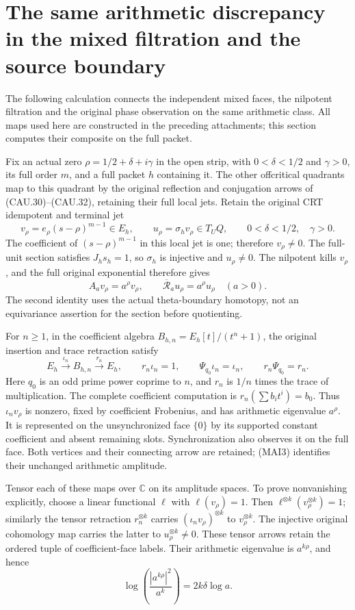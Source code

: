 \section{The same arithmetic discrepancy in the mixed filtration and the source boundary}
\label{CFStage:sec:mixed-amplification-identity}

The following calculation connects the independent mixed faces, the
nilpotent filtration and the original phase observation on the same
arithmetic class. All maps used here are constructed in the preceding
attachments; this section computes their composite on the full packet.

Fix an actual zero $\rho=1/2+\delta+i\gamma$ in the open strip,
with $0<\delta<1/2$ and $\gamma>0$, its full order $m$, and a
full packet $h$ containing it. The other offcritical quadrants
map to this quadrant by the original reflection and conjugation
arrows of (CAU.30)--(CAU.32), retaining their full local jets.
Retain
the original CRT idempotent and terminal jet
\[
 v_\rho=e_\rho(s-\rho)^{m-1}\in E_h,
 \qquad u_\rho=\sigma_hv_\rho\in T_UQ,
 \qquad 0<\delta<1/2,\quad\gamma>0.
 \tag{MAI1}
\]
The coefficient of $(s-\rho)^{m-1}$ in this local jet is one;
therefore $v_\rho\ne0$. The full-unit section satisfies
$J_hs_h=1$, so $\sigma_h$ is injective and $u_\rho\ne0$.
The nilpotent kills $v_\rho$, and the full original exponential
therefore gives
\[
 A_av_\rho=a^\rho v_\rho,
 \qquad \overline{\mathcal R}_a u_\rho=a^\rho u_\rho
 \quad(a>0).
 \tag{MAI2}
\]
The second identity uses the actual theta-boundary homotopy, not an
equivariance assertion for the section before quotienting.

For $n\geq1$, in the coefficient algebra $B_{h,n}=E_h[t]/(t^n+1)$, the original
insertion and trace retraction satisfy
\[
 E_h\xrightarrow{\iota_n}B_{h,n}\xrightarrow{r_n}E_h,
 \qquad r_n\iota_n=1,
 \qquad \Psi_{q_0}\iota_n=\iota_n,
 \qquad r_n\Psi_{q_0}=r_n.
 \tag{MAI3}
\]
Here $q_0$ is an odd prime power coprime to $n$, and $r_n$ is $1/n$ times
the trace of multiplication. The complete coefficient computation
is $r_n(\sum b_it^i)=b_0$. Thus $\iota_nv_\rho$ is nonzero,
fixed by coefficient Frobenius, and has arithmetic eigenvalue
$a^\rho$. It is represented on the unsynchronized face $\{0\}$
by its supported constant coefficient and absent remaining slots.
Synchronization also observes it on the full face. Both vertices
and their connecting arrow are retained; (MAI3) identifies their
unchanged arithmetic amplitude.

Tensor each of these maps over $\mathbb C$ on its amplitude
spaces. To prove nonvanishing explicitly, choose a linear
functional $\ell$ with $\ell(v_\rho)=1$. Then
$\ell^{\otimes k}(v_\rho^{\otimes k})=1$; similarly the tensor
retraction $r_n^{\otimes k}$ carries
$(\iota_nv_\rho)^{\otimes k}$ to $v_\rho^{\otimes k}$.
The injective original cohomology map carries the latter to
$u_\rho^{\otimes k}\ne0$. These tensor arrows retain the ordered
tuple of coefficient-face labels. Their arithmetic eigenvalue is
$a^{k\rho}$, and hence
\[
 \log\!\left(\frac{|a^{k\rho}|^2}{a^k}\right)
       =2k\delta\log a.
 \tag{MAI4}
\]

